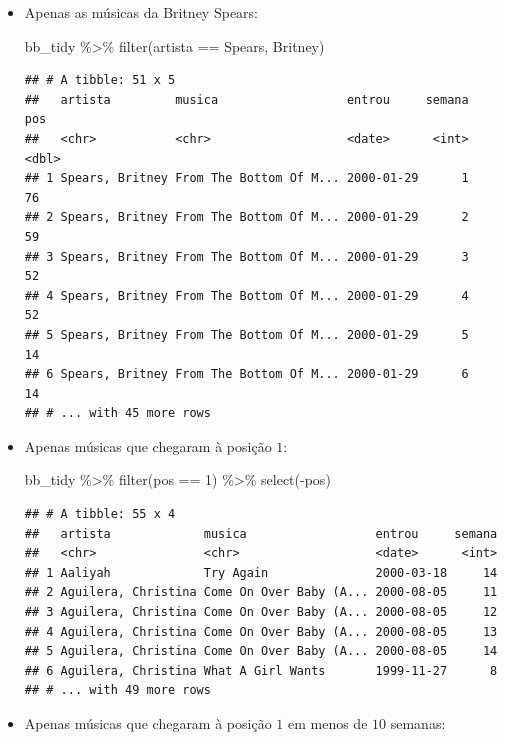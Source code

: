 \documentclass[
  11pt]{report}
\newenvironment{Shaded}{\begin{snugshade}}{\end{snugshade}}
\newcommand{\DecValTok}[1]{\textcolor[rgb]{0.00,0.00,0.81}{#1}}
\newcommand{\FunctionTok}[1]{\textcolor[rgb]{0.00,0.00,0.00}{#1}}
\newcommand{\NormalTok}[1]{#1}
\newcommand{\SpecialCharTok}[1]{\textcolor[rgb]{0.00,0.00,0.00}{#1}}
\newcommand{\StringTok}[1]{\textcolor[rgb]{0.31,0.60,0.02}{#1}}
\renewenvironment{Shaded}{
    \begin{mdframed}[%
      roundcorner=2pt,%
      innerleftmargin=5pt,%
      innerrightmargin=5pt,%
      topline=true,%
      leftline=true,%
      rightline=true,%
      bottomline=true,%
      linewidth=0.5pt,%
      linecolor=black!20,%
      backgroundcolor=black!2,%
      skipabove=2ex,%
      skipbelow=2.5ex%
    ]%
  }
  {
    \end{mdframed}
  }
\begin{document}
\begin{itemize}
\item
  Apenas as músicas da Britney Spears:

\begin{Shaded}
\begin{Highlighting}[]
\NormalTok{bb\_tidy }\SpecialCharTok{\%\textgreater{}\%} 
  \FunctionTok{filter}\NormalTok{(artista }\SpecialCharTok{==} \StringTok{\textquotesingle{}Spears, Britney\textquotesingle{}}\NormalTok{)}
\end{Highlighting}
\end{Shaded}

\begin{verbatim}
## # A tibble: 51 x 5
##   artista         musica                  entrou     semana   pos
##   <chr>           <chr>                   <date>      <int> <dbl>
## 1 Spears, Britney From The Bottom Of M... 2000-01-29      1    76
## 2 Spears, Britney From The Bottom Of M... 2000-01-29      2    59
## 3 Spears, Britney From The Bottom Of M... 2000-01-29      3    52
## 4 Spears, Britney From The Bottom Of M... 2000-01-29      4    52
## 5 Spears, Britney From The Bottom Of M... 2000-01-29      5    14
## 6 Spears, Britney From The Bottom Of M... 2000-01-29      6    14
## # ... with 45 more rows
\end{verbatim}
\item
  Apenas músicas que chegaram à posição $1$:

\begin{Shaded}
\begin{Highlighting}[]
\NormalTok{bb\_tidy }\SpecialCharTok{\%\textgreater{}\%} 
  \FunctionTok{filter}\NormalTok{(pos }\SpecialCharTok{==} \DecValTok{1}\NormalTok{) }\SpecialCharTok{\%\textgreater{}\%} 
  \FunctionTok{select}\NormalTok{(}\SpecialCharTok{{-}}\NormalTok{pos)}
\end{Highlighting}
\end{Shaded}

\begin{verbatim}
## # A tibble: 55 x 4
##   artista             musica                  entrou     semana
##   <chr>               <chr>                   <date>      <int>
## 1 Aaliyah             Try Again               2000-03-18     14
## 2 Aguilera, Christina Come On Over Baby (A... 2000-08-05     11
## 3 Aguilera, Christina Come On Over Baby (A... 2000-08-05     12
## 4 Aguilera, Christina Come On Over Baby (A... 2000-08-05     13
## 5 Aguilera, Christina Come On Over Baby (A... 2000-08-05     14
## 6 Aguilera, Christina What A Girl Wants       1999-11-27      8
## # ... with 49 more rows
\end{verbatim}
\item
  Apenas músicas que chegaram à posição $1$ em menos de $10$ semanas:


\end{itemize}
\end{document}

